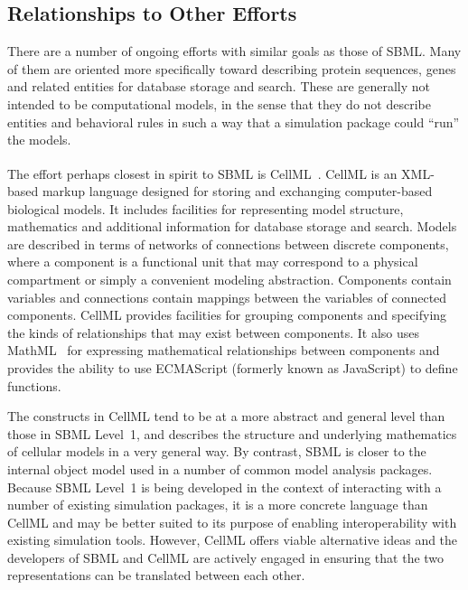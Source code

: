 \documentclass[10pt]{cekarticle}
\newcommand{\tm}{\textsuperscript{\tiny{\texttrademark}}}
\newcommand{\changed}[1]{\textcolor{BrickRed}{#1}}
\begin{document}
\subsection{Relationships to Other Efforts}
\label{sec:other-efforts}


There are a number of ongoing efforts with similar goals as those of SBML.
Many of them are oriented more specifically toward describing protein
sequences, genes and related entities for database storage and search.
These are generally not intended to be computational models, in the sense
that they do not describe entities and behavioral rules in such a way that
a simulation package could ``run'' the models.

The effort perhaps closest in spirit to SBML is
CellML\tm~\citep{physiome:2001}.  CellML is an XML-based markup language
designed for storing and exchanging computer-based biological models.  It
includes facilities for representing model structure, mathematics and
additional information for database storage and search.  Models are
described in terms of networks of connections between discrete components,
where a component is a functional unit that may correspond to a physical
compartment or simply a convenient modeling abstraction.  Components
contain variables and connections contain mappings between the variables of
connected components.  CellML provides facilities for grouping components
and specifying the kinds of relationships that may exist between
components.  It also uses MathML~\citep{w3c:2000b} for expressing mathematical
relationships between components and provides the ability to use ECMAScript
(formerly known as JavaScript) to define functions.

The constructs in CellML tend to be at a more abstract and general level
than those in SBML Level~1, and describes the structure and underlying
mathematics of cellular models in a very general way.  By contrast, SBML is
closer to the internal object model used in \changed{a number of common
  model analysis packages}.  Because SBML Level~1 is being developed in the
context of interacting with a number of existing simulation packages, it is
a more concrete language than CellML and may be better suited to its
purpose of enabling interoperability with existing simulation tools.
However, CellML offers viable alternative ideas and the developers of SBML
and CellML are actively engaged in ensuring that the two representations
can be translated between each other.
\end{document}
